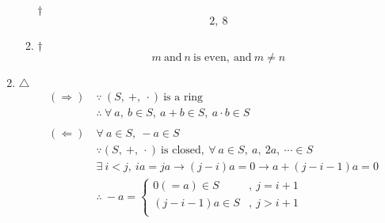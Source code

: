 \documentclass[a4paper,12pt]{article}
\begin{document}
\begin{enumerate}
\begin{enumerate}[label=(\alph*)]
\begin{answer}{$\dag$}
\begin{equation}
                2, \ 8
            \end{equation}
        \end{answer}
        \item \begin{answer}{$\dag$}\begin{equation}
                m \ \text{and} \ n \ \text{is even}, \ \text{and} \ m \neq n
            \end{equation}
        \end{answer}
    \end{enumerate}
    \item \begin{answer}{$\triangle$}\begin{equation}
            \begin{aligned}
                & \begin{aligned}
                    (\Rightarrow) \ & \because \ (S, \ +, \ \cdot) \ \text{is a ring} \\
                    & \therefore \ \forall \ a, \ b \in S, \ a + b \in S, \ a \cdot b \in S
                \end{aligned} \\
                & \begin{aligned}
                    (\Leftarrow) \ & \forall \ a \in S, \ -a \in S \\
                    & \because (S, \ +, \ \cdot) \ \text{is closed}, \ \forall \ a \in S, \ a, \ 2a, \ \cdots \in S \\
                    & \exists \ i < j, \ ia = ja \rightarrow (j - i)a = 0 \rightarrow a + (j - i - 1)a = 0 \\
                    & \therefore \ -a = \begin{cases}
                        0 (= a) \in S &, \ j = i + 1 \\
                        (j - i - 1)a \in S &, \ j > i + 1 \\
                    \end{cases}
                \end{aligned}
            \end{aligned}
        \end{equation}
    \end{answer}
\end{enumerate}

\end{document}

